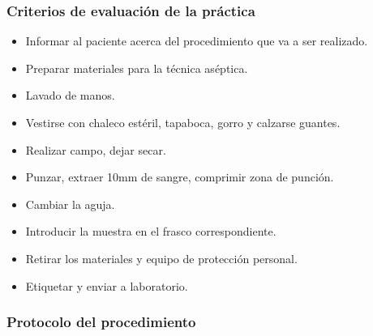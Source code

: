 \subsubsection{Criterios de evaluación de la práctica}
\begin{itemize}
\item Informar al paciente acerca del procedimiento que va a ser realizado.
\item Preparar materiales para la técnica aséptica.
\item Lavado de manos.
\item Vestirse con chaleco estéril, tapaboca, gorro y calzarse guantes.
\item Realizar campo, dejar secar.
\item Punzar, extraer 10mm de sangre, comprimir zona de punción.
\item Cambiar la aguja.
\item Introducir la muestra en el frasco correspondiente.
\item Retirar los materiales y equipo de protección personal.
\item Etiquetar y enviar a laboratorio.
\end{itemize}

\subsubsection{Protocolo del procedimiento}

